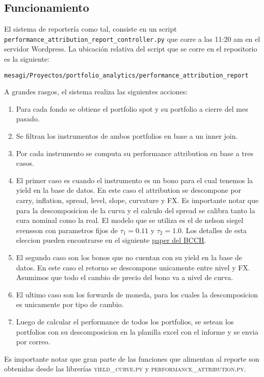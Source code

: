 \documentclass{article}
\begin{document}
\subsection{Funcionamiento}

El sistema de reportería como tal, consiste en un script \texttt{performance\_attribution\_report\_controller.py} que corre a las 11:20 am en el servidor Wordpress. La ubicación relativa del script que se corre en el repositorio es la siguiente:
\begin{center}
\texttt{mesagi/Proyectos/portfolio\_analytics/performance\_attribution\_report}
\end{center}

A grandes rasgos, el sistema realiza las siguientes acciones:


\begin{enumerate}
\item Para cada fondo se obtiene el portfolio spot y su portfolio a cierre del mes pasado.
\item Se filtran los instrumentos de ambos portfolios en base a un inner join.
\item Por cada instrumento se computa su performance attribution en base a tres casos.
\item El primer caso es cuando el instrumento es un bono para el cual tenemos la yield en la base de datos. En este caso
el attribution se descompone por carry, inflation, spread, level, slope, curvature y FX. Es importante notar que para la
descomposicion de la curva y el calculo del spread se calibra tanto la cura nominal como la real. El modelo que se utiliza
es el de nelson siegel svensson con parametros fijos de $\tau_1 = 0.11$ y $\tau_2 = 1.0$. Los detalles de esta eleccion 
pueden encontrarse en el siguiente \href{http://www.scielo.cl/pdf/rae/v29n2/art01.pdf}{paper del BCCH}.
\item El segundo caso son los bonos que no cuentan con su yield en la base de datos. En este caso el retorno se descompone unicamente entre nivel y FX. Asumimos que todo el cambio de precio del bono va a nivel de curva.
\item El ultimo caso son los forwards de moneda, para los cuales la descomposicion es unicamente por tipo de cambio.
\item Luego de calcular el performance de todos los portfolios, se setean los portfolios con su descomposicion en la planilla excel con el informe y se envia por correo.
\end{enumerate}

Es importante notar que gran parte de las funciones que alimentan al reporte son obtenidas desde las librerías \textsc{yield\_curve.py} y \textsc{performance\_attribution.py}. 
\end{document}
